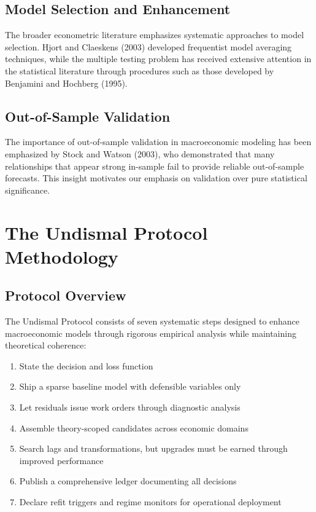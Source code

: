 \documentclass[12pt]{article}
\begin{document}
\subsection{Model Selection and Enhancement}

The broader econometric literature emphasizes systematic approaches to model selection. Hjort and Claeskens (2003) developed frequentist model averaging techniques, while the multiple testing problem has received extensive attention in the statistical literature through procedures such as those developed by Benjamini and Hochberg (1995).

\subsection{Out-of-Sample Validation}

The importance of out-of-sample validation in macroeconomic modeling has been emphasized by Stock and Watson (2003), who demonstrated that many relationships that appear strong in-sample fail to provide reliable out-of-sample forecasts. This insight motivates our emphasis on validation over pure statistical significance.

\section{The Undismal Protocol Methodology}

\subsection{Protocol Overview}

The Undismal Protocol consists of seven systematic steps designed to enhance macroeconomic models through rigorous empirical analysis while maintaining theoretical coherence:

\begin{enumerate}
\item State the decision and loss function
\item Ship a sparse baseline model with defensible variables only
\item Let residuals issue work orders through diagnostic analysis
\item Assemble theory-scoped candidates across economic domains
\item Search lags and transformations, but upgrades must be earned through improved performance
\item Publish a comprehensive ledger documenting all decisions
\item Declare refit triggers and regime monitors for operational deployment
\end{enumerate}
\end{document}
